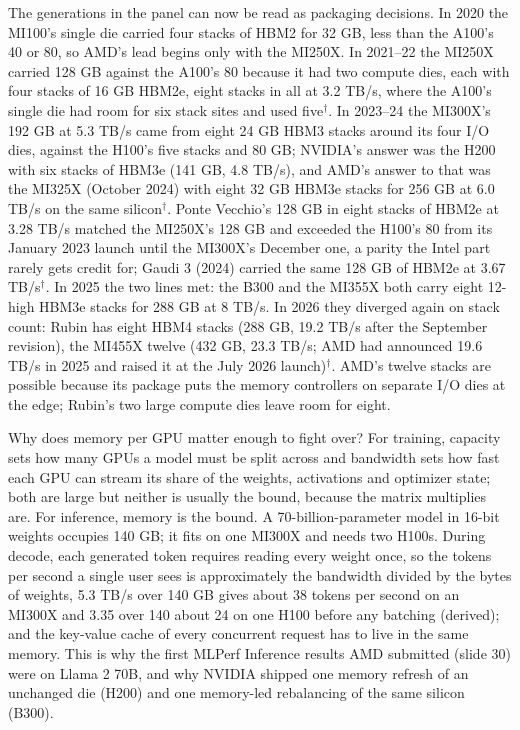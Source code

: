 \documentclass[11pt,letterpaper]{article}
\begin{document}
The generations in the panel can now be read as packaging decisions. In 2020 the MI100's single die carried four stacks of HBM2 for 32 GB, less than the A100's 40 or 80, so AMD's lead begins only with the MI250X. In 2021--22 the MI250X carried 128 GB against the A100's 80 because it had two compute dies, each with four stacks of 16 GB HBM2e, eight stacks in all at 3.2 TB/s, where the A100's single die had room for six stack sites and used five$^\dagger$. In 2023--24 the MI300X's 192 GB at 5.3 TB/s came from eight 24 GB HBM3 stacks around its four I/O dies, against the H100's five stacks and 80 GB; NVIDIA's answer was the H200 with six stacks of HBM3e (141 GB, 4.8 TB/s), and AMD's answer to that was the MI325X (October 2024) with eight 32 GB HBM3e stacks for 256 GB at 6.0 TB/s on the same silicon$^\dagger$. Ponte Vecchio's 128 GB in eight stacks of HBM2e at 3.28 TB/s matched the MI250X's 128 GB and exceeded the H100's 80 from its January 2023 launch until the MI300X's December one, a parity the Intel part rarely gets credit for; Gaudi 3 (2024) carried the same 128 GB of HBM2e at 3.67 TB/s$^\dagger$. In 2025 the two lines met: the B300 and the MI355X both carry eight 12-high HBM3e stacks for 288 GB at 8 TB/s. In 2026 they diverged again on stack count: Rubin has eight HBM4 stacks (288 GB, 19.2 TB/s after the September revision), the MI455X twelve (432 GB, 23.3 TB/s; AMD had announced 19.6 TB/s in 2025 and raised it at the July 2026 launch)$^\dagger$. AMD's twelve stacks are possible because its package puts the memory controllers on separate I/O dies at the edge; Rubin's two large compute dies leave room for eight.

Why does memory per GPU matter enough to fight over? For training, capacity sets how many GPUs a model must be split across and bandwidth sets how fast each GPU can stream its share of the weights, activations and optimizer state; both are large but neither is usually the bound, because the matrix multiplies are. For inference, memory is the bound. A 70-billion-parameter model in 16-bit weights occupies 140 GB; it fits on one MI300X and needs two H100s. During decode, each generated token requires reading every weight once, so the tokens per second a single user sees is approximately the bandwidth divided by the bytes of weights, 5.3 TB/s over 140 GB gives about 38 tokens per second on an MI300X and 3.35 over 140 about 24 on one H100 before any batching (derived); and the key-value cache of every concurrent request has to live in the same memory. This is why the first MLPerf Inference results AMD submitted (slide 30) were on Llama 2 70B, and why NVIDIA shipped one memory refresh of an unchanged die (H200) and one memory-led rebalancing of the same silicon (B300).
\end{document}
